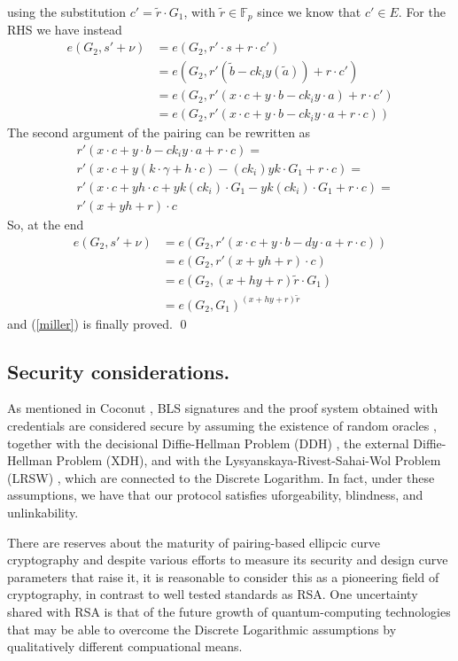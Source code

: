 \documentclass[twocolumn]{article}
\begin{document}
using the substitution $c'=\tilde{r}\cdot G_1$, with $\tilde{r}\in\mathbb{F}_p$ since we know that $c'\in E$. For the RHS we have instead
\begin{align*}
    e(G_2, s' + \nu) &= e(G_2, r'\cdot s + r \cdot c') \\
    &= e(G_2, r'(\tilde{b} - ck_i y (\tilde{a})) + r \cdot c') \\
    &= e(G_2, r'(x\cdot c + y\cdot b - ck_i y\cdot a) + r \cdot c') \\
    &= e(G_2, r'(x\cdot c + y\cdot b - ck_i y\cdot a + r \cdot c)) 
\end{align*}
The second argument of the pairing can be rewritten as
\[
\begin{split}
    &r'(x\cdot c + y\cdot b - ck_i y\cdot a + r \cdot c) = \\
    &r'(x\cdot c + y(k\cdot \gamma + h\cdot c) - (ck_i) yk\cdot G_1 + r \cdot c) = \\
    &r'(x\cdot c + yh\cdot c + yk(ck_i)\cdot G_1  - yk(ck_i)\cdot G_1 + r \cdot c) = \\
    &r'(x + yh + r) \cdot c
\end{split}
\]
So, at the end
\[
\begin{split}
    e(G_2, s' + \nu) &= e(G_2, r'(x\cdot c + y\cdot b - dy\cdot a + r \cdot c)) \\
    &= e(G_2, r'(x + yh + r) \cdot c) \\
    &= e(G_2,(x+hy+r)\tilde{r}\cdot G_1) \\
    &= e(G_2,G_1)^{(x+hy+r)\tilde{r}}
\end{split}
\]
and (\ref{miller}) is finally proved. 
\qed

\subsection*{Security considerations.} 

As mentioned in Coconut \citep{coconut-2018}, BLS signatures and the
proof system obtained with credentials are considered secure by assuming
the existence of random oracles \citep{random-oracle}, together with the
decisional Diffie-Hellman Problem (DDH) \citep{DDH-problem}, the
external Diffie-Hellman Problem (XDH), and with the
Lysyanskaya-Rivest-Sahai-Wol Problem (LRSW) \citep{lrsw-assumption},
which are connected to the Discrete Logarithm. In fact, under these
assumptions, we have that our protocol satisfies uforgeability,
blindness, and unlinkability.

There are reserves about the maturity of pairing-based ellipcic curve
cryptography and despite various efforts to measure its security and
design curve parameters that raise it, it is reasonable to consider this
as a pioneering field of cryptography, in contrast to well tested
standards as RSA. One uncertainty shared with RSA is that of the future
growth of quantum-computing technologies that may be able to overcome
the Discrete Logarithmic assumptions by qualitatively different
compuational means.
\end{document}
